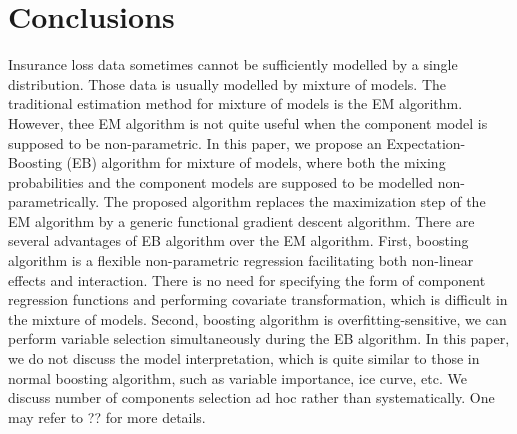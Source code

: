 \documentclass[11pt]{article}
\numberwithin{equation}{section}
\begin{document}
\section{Conclusions}\label{sec:conclusions}
Insurance loss data sometimes cannot be sufficiently modelled by a single distribution.
Those data is usually modelled by mixture of models.
The traditional estimation method for mixture of models is the EM algorithm.
However, thee EM algorithm is not quite useful when the component model is supposed to be non-parametric.
In this paper, we propose an Expectation-Boosting (EB) algorithm for mixture of models, where both the mixing probabilities and the component models are supposed to be modelled non-parametrically. 
The proposed algorithm replaces the maximization step of the EM algorithm by a generic functional gradient descent algorithm.
There are several advantages of EB algorithm over the EM algorithm. 
First, boosting algorithm is a flexible non-parametric regression facilitating both {non-linear effects and interaction}.  
There is no need for specifying the form of component regression functions and performing covariate transformation, which is difficult in the mixture of models.
Second, boosting algorithm is {overfitting-sensitive}, we can perform {variable selection} simultaneously during the EB algorithm.
In this paper, we do not discuss the model interpretation, which is quite similar to those in normal boosting algorithm, such as variable importance, ice curve, etc. 
We discuss number of components selection ad hoc rather than systematically.
One may refer to ?? for more details.




\end{document}
